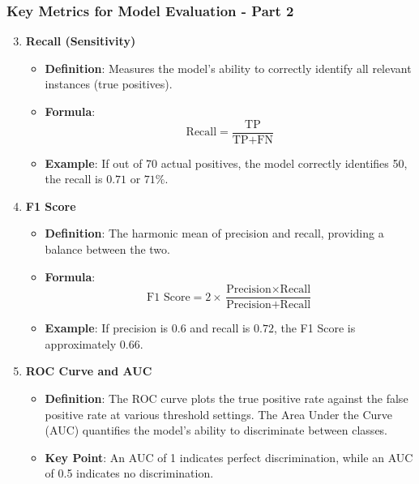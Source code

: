 \documentclass[aspectratio=169]{beamer}
\begin{document}
\begin{frame}[fragile]
    \frametitle{Key Metrics for Model Evaluation - Part 2}
    \begin{enumerate}
        \setcounter{enumi}{2} %
        \item \textbf{Recall (Sensitivity)}
            \begin{itemize}
                \item \textbf{Definition}: Measures the model’s ability to correctly identify all relevant instances (true positives).
                \item \textbf{Formula}:
                    \[
                    \text{Recall} = \frac{\text{TP}}{\text{TP} + \text{FN}}
                    \]
                \item \textbf{Example}: If out of 70 actual positives, the model correctly identifies 50, the recall is \(0.71\) or \(71\%\).
            \end{itemize}
        
        \item \textbf{F1 Score}
            \begin{itemize}
                \item \textbf{Definition}: The harmonic mean of precision and recall, providing a balance between the two.
                \item \textbf{Formula}:
                    \[
                    \text{F1 Score} = 2 \times \frac{\text{Precision} \times \text{Recall}}{\text{Precision} + \text{Recall}}
                    \]
                \item \textbf{Example}: If precision is \(0.6\) and recall is \(0.72\), the F1 Score is approximately \(0.66\).
            \end{itemize}
        
        \item \textbf{ROC Curve and AUC}
            \begin{itemize}
                \item \textbf{Definition}: The ROC curve plots the true positive rate against the false positive rate at various threshold settings. The Area Under the Curve (AUC) quantifies the model's ability to discriminate between classes.
                \item \textbf{Key Point}: An AUC of 1 indicates perfect discrimination, while an AUC of 0.5 indicates no discrimination.
            \end{itemize}
    \end{enumerate}
\end{frame}
\end{document}
